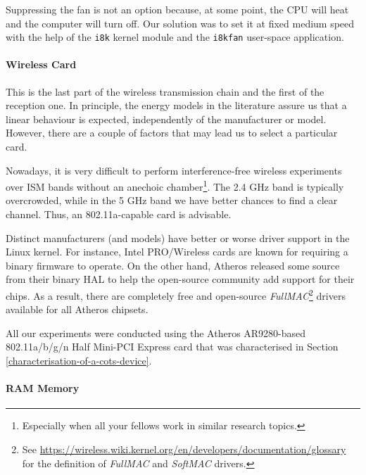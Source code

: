 \documentclass[twoside,nohyper]{tufte-book}
\providecommand{\tightlist}{%
  \setlength{\itemsep}{0pt}\setlength{\parskip}{0pt}}
\theoremstyle{definition}
\theoremstyle{definition}
\theoremstyle{definition}
\theoremstyle{remark}
\begin{document}
Suppressing the fan is not an option because, at some point, the CPU
will heat and the computer will turn off. Our solution was to set it at
fixed medium speed with the help of the \texttt{i8k} kernel module and
the \texttt{i8kfan} user-space application.

\hypertarget{wireless-card}{%
\paragraph{Wireless Card}\label{wireless-card}}

This is the last part of the wireless transmission chain and the first
of the reception one. In principle, the energy models in the literature
assure us that a linear behaviour is expected, independently of the
manufacturer or model. However, there are a couple of factors that may
lead us to select a particular card.

\begin{description}
\tightlist
\item[Supported capabilities]
Nowadays, it is very difficult to perform interference-free wireless
experiments over ISM bands without an anechoic chamber\footnote{Especially
  when all your fellows work in similar research topics.}. The 2.4 GHz
band is typically overcrowded, while in the 5 GHz band we have better
chances to find a clear channel. Thus, an 802.11a-capable card is
advisable.
\item[Manufacturer]
Distinct manufacturers (and models) have better or worse driver support
in the Linux kernel. For instance, Intel PRO/Wireless cards are known
for requiring a binary firmware to operate. On the other hand, Atheros
released some source from their binary HAL to help the open-source
community add support for their chips. As a result, there are completely
free and open-source \emph{FullMAC}\footnote{See
  \url{https://wireless.wiki.kernel.org/en/developers/documentation/glossary}
  for the definition of \emph{FullMAC} and \emph{SoftMAC} drivers.}
drivers available for all Atheros chipsets.
\end{description}

All our experiments were conducted using the Atheros AR9280-based
802.11a/b/g/n Half Mini-PCI Express card that was characterised in
Section \ref{characterisation-of-a-cots-device}.

\hypertarget{ram-memory}{%
\paragraph{RAM Memory}\label{ram-memory}}
\end{document}
